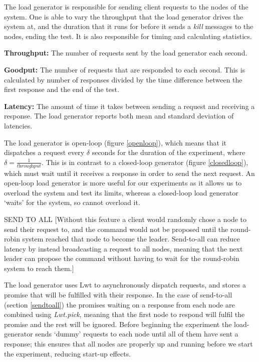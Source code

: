 The load generator is responsible for sending client requests to the nodes of the system. One is able to vary the throughput that the load generator drives the system at, and the duration that it runs for before it sends a \textit{kill} messages to the nodes, ending the test. It is also responsible for timing and calculating statistics.

\textbf{Throughput: } The number of requests sent by the load generator each second.

\textbf{Goodput: } The number of requests that are responded to each second. This is calculated by number of responses divided by the time difference between the first response and the end of the test.

\textbf{Latency: } The amount of time it takes between sending a request and receiving a response. The load generator reports both mean and standard deviation of latencies.

The load generator is open-loop (figure \ref{openloop}), which means that it dispatches a request every $\delta$ seconds for the duration of the experiment, where $\delta = \frac{1}{\textit{throughput}}$. This is in contrast to a closed-loop generator (figure \ref{closedloop}), which must wait until it receives a response in order to send the next request. An open-loop load generator is more useful for our experiments as it allows us to overload the system and test its limits, whereas a closed-loop load generator `waits' for the system, so cannot overload it.

SEND TO ALL
[Without this feature a client would randomly chose a node to send their request to, and the command would not be proposed until the round-robin system reached that node to become the leader. Send-to-all can reduce latency by instead broadcasting a request to all nodes, meaning that the next leader can propose the command without having to wait for the round-robin system to reach them.]

The load generator uses Lwt to asynchronously dispatch requests, and stores a promise that will be fulfilled with their response. In the case of send-to-all (section \ref{sendtoall}) the promises waiting on a response from each node are combined using \textit{Lwt.pick}, meaning that the first node to respond will fulfil the promise and the rest will be ignored. Before beginning the experiment the load-generator sends `dummy' requests to each node until all of them have sent a response; this ensures that all nodes are properly up and running before we start the experiment, reducing start-up effects.

